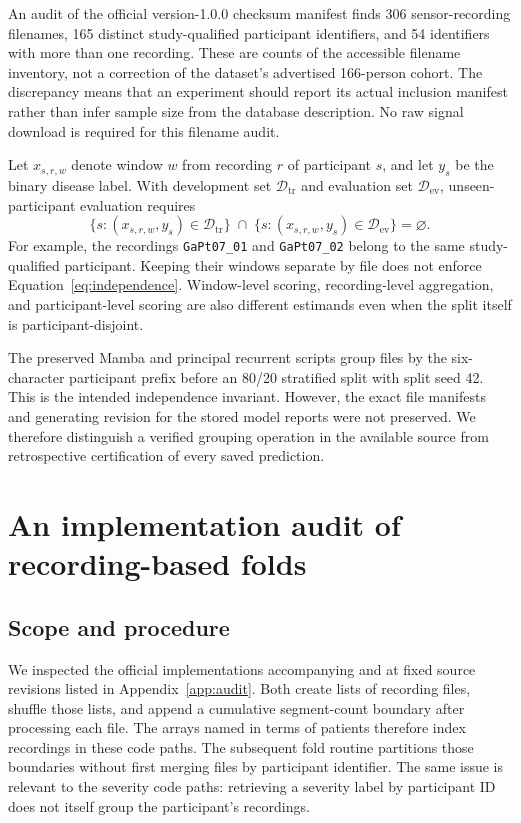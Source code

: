 An audit of the official version-1.0.0 checksum manifest finds 306 sensor-recording filenames, 165 distinct study-qualified participant identifiers, and 54 identifiers with more than one recording. These are counts of the accessible filename inventory, not a correction of the dataset's advertised 166-person cohort. The discrepancy means that an experiment should report its actual inclusion manifest rather than infer sample size from the database description. No raw signal download is required for this filename audit.

Let $x_{s,r,w}$ denote window $w$ from recording $r$ of participant $s$, and let $y_s$ be the binary disease label. With development set $\mathcal D_{\mathrm{tr}}$ and evaluation set $\mathcal D_{\mathrm{ev}}$, unseen-participant evaluation requires
\begin{equation}
  \{s:(x_{s,r,w},y_s)\in\mathcal D_{\mathrm{tr}}\}
  \;\cap\;
  \{s:(x_{s,r,w},y_s)\in\mathcal D_{\mathrm{ev}}\}
  =\varnothing .
  \label{eq:independence}
\end{equation}
For example, the recordings \texttt{GaPt07\_01} and \texttt{GaPt07\_02} belong to the same study-qualified participant. Keeping their windows separate by file does not enforce Equation~\ref{eq:independence}. Window-level scoring, recording-level aggregation, and participant-level scoring are also different estimands even when the split itself is participant-disjoint.

The preserved Mamba and principal recurrent scripts group files by the six-character participant prefix before an 80/20 stratified split with split seed 42. This is the intended independence invariant. However, the exact file manifests and generating revision for the stored model reports were not preserved. We therefore distinguish a verified grouping operation in the available source from retrospective certification of every saved prediction.

\section{An implementation audit of recording-based folds}
\label{sec:audit}
\subsection{Scope and procedure}
We inspected the official implementations accompanying \citet{elmaachi2020} and \citet{naimi2024} at fixed source revisions listed in Appendix~\ref{app:audit}. Both create lists of recording files, shuffle those lists, and append a cumulative segment-count boundary after processing each file. The arrays named in terms of patients therefore index recordings in these code paths. The subsequent fold routine partitions those boundaries without first merging files by participant identifier. The same issue is relevant to the severity code paths: retrieving a severity label by participant ID does not itself group the participant's recordings.

